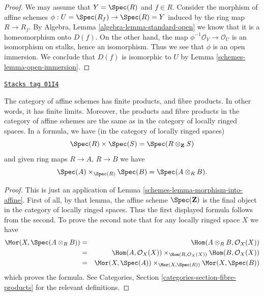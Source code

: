 \begin{proof}

We may assume that $Y = \Spec(R)$ and $f \in R$.
Consider the morphism of affine schemes
$\phi : U = \Spec(R_f) \to \Spec(R) = Y$ induced by the ring
map $R \to R_f$. By Algebra, Lemma \ref{algebra-lemma-standard-open}
we know that it is a homeomorphism onto $D(f)$.
On the other hand, the map $\phi^{-1}\mathcal{O}_Y \to \mathcal{O}_U$
is an isomorphism on stalks, hence an isomorphism. Thus we see
that $\phi$ is an open immersion. We conclude that $D(f)$
is isomorphic to $U$ by Lemma \ref{schemes-lemma-open-immersion}.
\end{proof}

\begin{lemma}
\label{schemes-lemma-fibre-product-affine-schemes}
\href{https://stacks.math.columbia.edu/tag/01I4}{\texttt{Stacks tag 01I4}}

The category of affine schemes has finite products, and fibre products.
In other words, it has finite limits. Moreover, the products
and fibre products in the category of affine schemes
are the same as in the category of locally ringed spaces.
In a formula, we have (in the category of locally ringed spaces)
$$
\Spec(R) \times \Spec(S) =
\Spec(R \otimes_{\mathbf{Z}} S)
$$
and given ring maps $R \to A$, $R \to B$ we have
$$
\Spec(A) \times_{\Spec(R)} \Spec(B)
=
\Spec(A \otimes_R B).
$$
\end{lemma}

\begin{proof}

This is just an application of Lemma \ref{schemes-lemma-morphism-into-affine}.
First of all, by that lemma, the affine scheme
$\Spec(\mathbf{Z})$ is the final object in the category
of locally ringed spaces. Thus the first displayed formula
follows from the second. To prove the second note that
for any locally ringed space $X$ we have
\begin{eqnarray*}
\Mor(X, \Spec(A \otimes_R B))
& = &
\Hom(A \otimes_R B, \mathcal{O}_X(X)) \\
& = &
\Hom(A, \mathcal{O}_X(X))
\times_{\Hom(R, \mathcal{O}_X(X))}
\Hom(B, \mathcal{O}_X(X)) \\
& = &
\Mor(X, \Spec(A))
\times_{\Mor(X, \Spec(R))}
\Mor(X, \Spec(B))
\end{eqnarray*}
which proves the formula.
See Categories, Section \ref{categories-section-fibre-products} for the
relevant definitions.
\end{proof}

